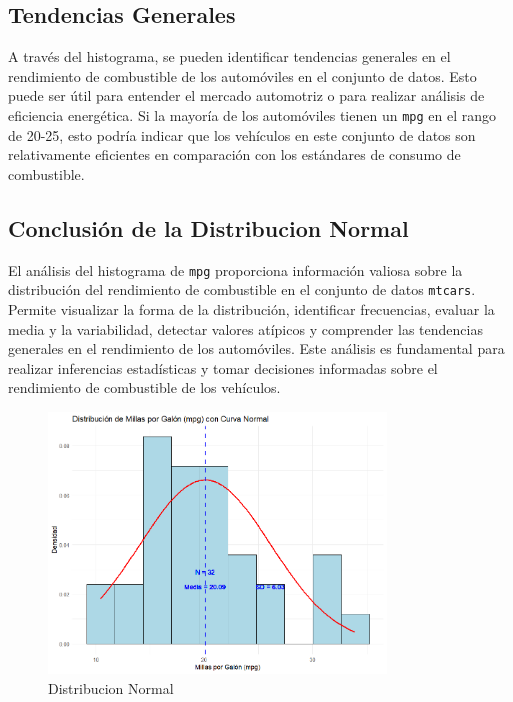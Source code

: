 \documentclass{article}
\begin{document}
\subsection{Tendencias Generales}
A través del histograma, se pueden identificar tendencias generales en el rendimiento de combustible de los automóviles en el conjunto de datos. Esto puede ser útil para entender el mercado automotriz o para realizar análisis de eficiencia energética. Si la mayoría de los automóviles tienen un \texttt{mpg} en el rango de 20-25, esto podría indicar que los vehículos en este conjunto de datos son relativamente eficientes en comparación con los estándares de consumo de combustible.

\subsection{Conclusión de la Distribucion Normal}
El análisis del histograma de \texttt{mpg} proporciona información valiosa sobre la distribución del rendimiento de combustible en el conjunto de datos \texttt{mtcars}. Permite visualizar la forma de la distribución, identificar frecuencias, evaluar la media y la variabilidad, detectar valores atípicos y comprender las tendencias generales en el rendimiento de los automóviles. Este análisis es fundamental para realizar inferencias estadísticas y tomar decisiones informadas sobre el rendimiento de combustible de los vehículos.
\begin{figure}[h] %
    \centering %
    \includegraphics[width=0.8\textwidth]{Image3.png}
    \caption{Distribucion Normal} %
    \label{fig:mi_imagen} %
\end{figure}
\end{document}
